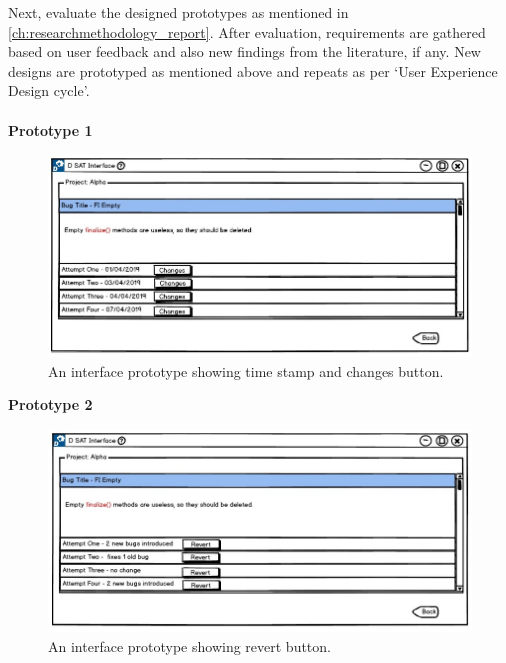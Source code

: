 Next, evaluate the designed prototypes as mentioned in \autoref{ch:researchmethodology_report}. After evaluation, requirements are gathered based on user feedback and also new findings from the literature, if any. New designs are prototyped as mentioned above and repeats as per ‘User Experience Design cycle’. \\ \\

\textbf{Prototype 1}
\begin{figure}[hbt!]
	\centering
	\includegraphics[width=\linewidth]{figures/d_changes}
	\caption{An interface prototype showing time stamp and changes button.}
	\label{fig:d_changes}
\end{figure}

\clearpage

\textbf{Prototype 2}
\begin{figure}[hbt!]
	\centering
	\includegraphics[width=\linewidth]{figures/d_revert}
	\caption{An interface prototype showing revert button.}
	\label{fig:d_revert}
\end{figure}

\let\cleardoublepage\clearpage


	